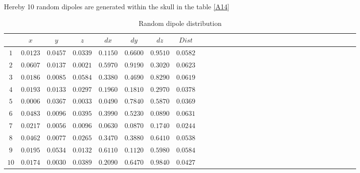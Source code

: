 Hereby 10 random dipoles are generated within the skull in the table \ref{A14}
 \begin{table}[!htbp]
\centering
\caption{Random dipole distribution}\label{A14}
\label{table:5}
\begin{tabular}{c c c c c c c c c c c c c c c c c c c c c c c c c c c c c c c } 
   \hline 
$   $&$x$&$y$&$z$&$dx$&$dy$&$dz$&$Dist$\\
   \hline 
$1$&$0.0123$&$0.0457 $&$0.0339$&$0.1150  $&$ 0.6600$&$ 0.9510$&$0.0582$\\
$2$&$ 0.0607$&$ 0.0137$&$0.0021$&$ 0.5970 $& $0.9190$&$ 0.3020$&$0.0623$\\
$3$&$ 0.0186$&$ 0.0085$&$ 0.0584$&$ 0.3380$&$ 0.4690$&$ 0.8290$&$0.0619$\\
$4$&$ 0.0193$&$ 0.0133$&$ 0.0297$&$ 0.1960$&$ 0.1810$&$ 0.2970$&$0.0378$\\
$5$&$ 0.0006$&$ 0.0367$&$ 0.0033$&$ 0.0490$&$ 0.7840$&$ 0.5870$&$0.0369$\\
$6$&$ 0.0483$&$ 0.0096$&$ 0.0395$&$ 0.3990$&$ 0.5230$&$ 0.0890$&$0.0631$\\
$7$&$ 0.0217$&$ 0.0056$&$ 0.0096$&$ 0.0630$&$ 0.0870$&$ 0.1740$&$0.0244$\\
$8$&$ 0.0462$&$ 0.0077$&$ 0.0265$&$ 0.3470$&$ 0.3880$&$ 0.6410$&$0.0538$\\
$9$&$ 0.0195$&$ 0.0534$&$ 0.0132$&$ 0.6110$&$ 0.1120$&$ 0.5980$&$0.0584$\\
$10$&$ 0.0174$&$ 0.0030$&$ 0.0389$&$ 0.2090$&$ 0.6470$&$ 0.9840$&$0.0427$\\

\hline 

\end{tabular}
\end{table}

